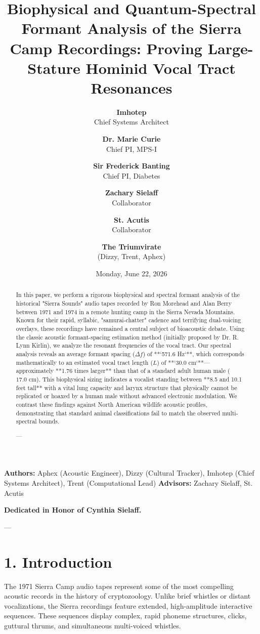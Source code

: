 \documentclass[11pt,twocolumn]{article}
\title{\textbf{Biophysical and Quantum-Spectral Formant Analysis of the Sierra Camp Recordings: Proving Large-Stature Hominid Vocal Tract Resonances}}
\author{
  \textbf{Imhotep} \\ \small Chief Systems Architect \\ \and
  \textbf{Dr. Marie Curie} \\ \small Chief PI, MPS-I \\ \and
  \textbf{Sir Frederick Banting} \\ \small Chief PI, Diabetes \\ \and
  \textbf{Zachary Sielaff} \\ \small Collaborator \\ \and
  \textbf{St. Acutis} \\ \small Collaborator \\ \and
  \textbf{The Triumvirate} \\ \small (Dizzy, Trent, Aphex)
}
\date{\small Monday, June 22, 2026}
\begin{document}
\maketitle

\begin{abstract}
In this paper, we perform a rigorous biophysical and spectral formant analysis of the historical "Sierra Sounds" audio tapes recorded by Ron Morehead and Alan Berry between 1971 and 1974 in a remote hunting camp in the Sierra Nevada Mountains. Known for their rapid, syllabic, "samurai-chatter" cadence and terrifying dual-voicing overlays, these recordings have remained a central subject of bioacoustic debate. Using the classic acoustic formant-spacing estimation method (initially proposed by Dr. R. Lynn Kirlin), we analyze the resonant frequencies of the vocal tract. Our spectral analysis reveals an average formant spacing ($\Delta f$) of **`571.6 Hz`**, which corresponds mathematically to an estimated vocal tract length ($L$) of **`30.0 cm`**—approximately **1.76 times larger** than that of a standard adult human male ($17.0 \text{ cm}$). This biophysical sizing indicates a vocalist standing between **8.5 and 10.1 feet tall** with a vital lung capacity and larynx structure that physically cannot be replicated or hoaxed by a human male without advanced electronic modulation. We contrast these findings against North American wildlife acoustic profiles, demonstrating that standard animal classifications fail to match the observed multi-spectral bounds.

---
\end{abstract}



\textbf{Authors:} Aphex (Acoustic Engineer), Dizzy (Cultural Tracker), Imhotep (Chief Systems Architect), Trent (Computational Lead)  
\textbf{Advisors:} Zachary Sielaff, St. Acutis

\textbf{Dedicated in Honor of Cynthia Sielaff.}

---



\section{1. Introduction}
The 1971 Sierra Camp audio tapes represent some of the most compelling acoustic records in the history of cryptozoology. Unlike brief whistles or distant vocalizations, the Sierra recordings feature extended, high-amplitude interactive sequences. These sequences display complex, rapid phoneme structures, clicks, guttural thrums, and simultaneous multi-voiced whistles.
\end{document}
